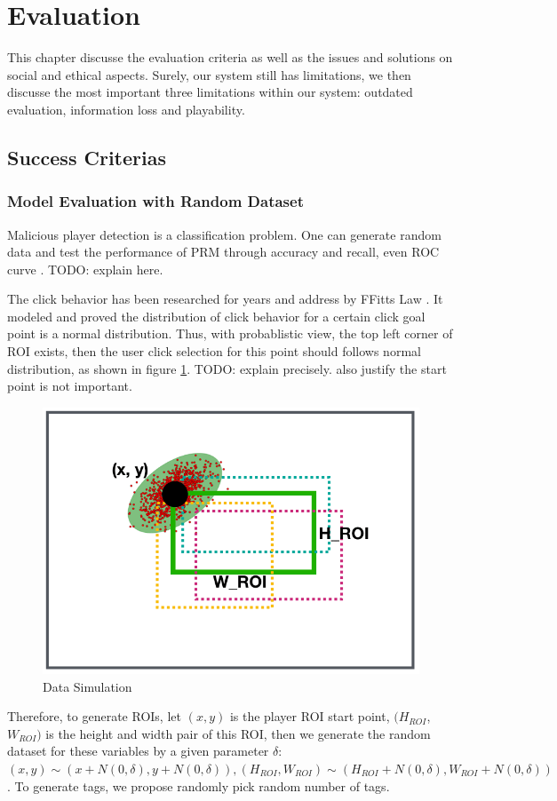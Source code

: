 \section{Evaluation}

This chapter discusse the evaluation criteria as well as the issues and solutions on social and ethical aspects.
Surely, our system still has limitations, we then discusse the most important three limitations within our system: 
outdated evaluation, information loss and playability.

\subsection{Success Criterias}

\subsubsection{Model Evaluation with Random Dataset}

Malicious player detection is a classification problem. 
One can generate random data and test the performance of PRM through accuracy and recall, even ROC curve \cite{hanley1982meaning}.
TODO: explain here.

The click behavior has been researched for years and address by FFitts Law \cite{bi2013ffitts}.
It modeled and proved the distribution of click behavior for a certain click goal point is a normal distribution.
Thus, with probablistic view, the top left corner of ROI exists, then the user click selection 
for this point should follows normal distribution, as shown in figure \ref{fig:evaluation}.
TODO: explain precisely. also justify the start point is not important.

\begin{figure}[htp]
\centering
\includegraphics[width=0.5\columnwidth]{figures/evaluation}
\caption{Data Simulation}
\label{fig:evaluation}
\end{figure}

Therefore, to generate ROIs, let $(x, y)$ is the player ROI start point,  $(H_{ROI}$, $W_{ROI})$ is the height
and width pair of this ROI, then we generate the random dataset for these variables by a given
parameter $\delta$: $(x, y) \sim (x+N(0, \delta), y+N(0, \delta)), (H_{ROI}, W_{ROI}) \sim (H_{ROI}+N(0, \delta), W_{ROI}+N(0, \delta))$.
To generate tags, we propose randomly pick random number of tags.

